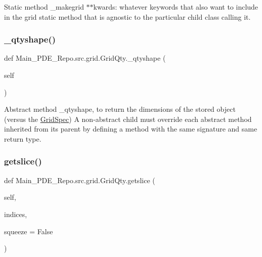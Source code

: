 Static method \+\_\+makegrid $\ast$$\ast$kwards\+: whatever keywords that also want to include in the grid static method that is agnostic to the particular child class calling it. 

\mbox{\label{classMain__PDE__Repo_1_1src_1_1grid_1_1GridQty_a0c68e16bd939efac875a60f539bb66f6}} 
\subsubsection{\texorpdfstring{\+\_\+qtyshape()}{\_qtyshape()}}
{\footnotesize\ttfamily def Main\+\_\+\+P\+D\+E\+\_\+\+Repo.\+src.\+grid.\+Grid\+Qty.\+\_\+qtyshape (\begin{DoxyParamCaption}\item[{}]{self }\end{DoxyParamCaption})\hspace{0.3cm}{\ttfamily [private]}}



Abstract method \+\_\+qtyshape, to return the dimensions of the stored object (versus the \hyperlink{classMain__PDE__Repo_1_1src_1_1grid_1_1GridSpec}{Grid\+Spec}) A non-\/abstract child must override each abstract method inherited from its parent by defining a method with the same signature and same return type. 

\mbox{\label{classMain__PDE__Repo_1_1src_1_1grid_1_1GridQty_a5080f35125b0d132cc1226d7967996bb}} 
\subsubsection{\texorpdfstring{getslice()}{getslice()}}
{\footnotesize\ttfamily def Main\+\_\+\+P\+D\+E\+\_\+\+Repo.\+src.\+grid.\+Grid\+Qty.\+getslice (\begin{DoxyParamCaption}\item[{}]{self,  }\item[{}]{indices,  }\item[{}]{squeeze = {\ttfamily False} }\end{DoxyParamCaption})}



